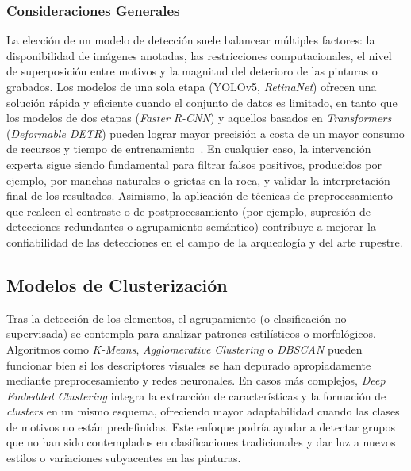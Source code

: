 \subsubsection*{Consideraciones Generales}

La elección de un modelo de detección suele balancear múltiples factores: la disponibilidad de imágenes anotadas, las restricciones computacionales, el nivel de superposición entre motivos y la magnitud del deterioro de las pinturas o grabados.
Los modelos de una sola etapa (YOLOv5, \textit{RetinaNet}) ofrecen una solución rápida y eficiente cuando el conjunto de datos es limitado, en tanto que los modelos de dos etapas (\textit{Faster R-CNN}) y aquellos basados en \textit{Transformers} (\textit{Deformable DETR}) pueden lograr mayor precisión a costa de un mayor consumo de recursos y tiempo de entrenamiento~\cite{horn2022,davis2021,jalandoni2022,li2022,tsigkas2020}.
En cualquier caso, la intervención experta sigue siendo fundamental para filtrar falsos positivos, producidos por ejemplo, por manchas naturales o grietas en la roca, y validar la interpretación final de los resultados.
Asimismo, la aplicación de técnicas de preprocesamiento que realcen el contraste o de postprocesamiento (por ejemplo, supresión de detecciones redundantes o agrupamiento semántico) contribuye a mejorar la confiabilidad de las detecciones en el campo de la arqueología y del arte rupestre.

\subsection{Modelos de Clusterización}

Tras la detección de los elementos, el agrupamiento (o clasificación no supervisada) se contempla para analizar patrones estilísticos o morfológicos.
Algoritmos como \textit{K-Means}, \textit{Agglomerative Clustering} o \textit{DBSCAN} pueden funcionar bien si los descriptores visuales se han depurado apropiadamente mediante preprocesamiento y redes neuronales.
En casos más complejos, \textit{Deep Embedded Clustering} integra la extracción de características y la formación de \textit{clusters} en un mismo esquema, ofreciendo mayor adaptabilidad cuando las clases de motivos no están predefinidas.
Este enfoque podría ayudar a detectar grupos que no han sido contemplados en clasificaciones tradicionales y dar luz a nuevos estilos o variaciones subyacentes en las pinturas.

